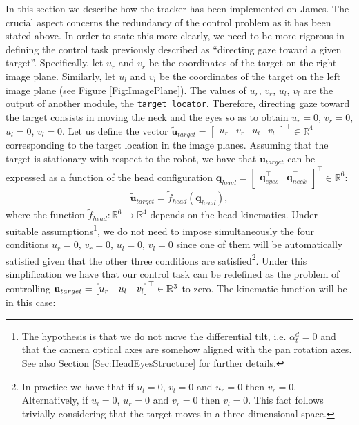 In this section we describe how the tracker has been implemented on James. The crucial aspect concerns the redundancy of the control problem as it has been stated above. In order to state this more clearly, we need to be more rigorous in defining the control task previously described as ``directing gaze toward a given target''. Specifically, let $u_r$ and $v_r$ be the coordinates of the target on the right image plane. Similarly, let $u_l$ and $v_l$ be the coordinates of the target on the left image plane (see Figure \ref{Fig:ImagePlane}). The values of $u_r$, $v_r$, $u_l$, $v_l$ are the output of another module, the {\tt target locator}. Therefore, directing gaze toward the target consists in moving the neck and the eyes so as to obtain $u_r=0$, $v_r=0$, $u_l=0$, $v_l=0$. Let us define the vector $\tilde {\mathbf u}_{target}= \begin{bmatrix} u_r & v_r & u_l & v_l \end{bmatrix}^\top \in \mathbb R^4$ corresponding to the target location in the image planes. Assuming that the target is stationary with respect to the robot, we have that $\tilde {\mathbf u}_{target}$ can be expressed as a function of the head configuration $\mathbf q_{head} = \begin{bmatrix} \mathbf q_{eyes}^\top & \mathbf q_{neck}^\top \end{bmatrix}^\top \in \mathbb R^6$:
\begin{eqnarray*}
\tilde {\mathbf u}_{target} = \tilde f_{head} (\mathbf q_{head}),
\end{eqnarray*}
where the function $\tilde f_{head} : \mathbb R^6 \longrightarrow \mathbb R^4$ depends on the head kinematics. Under suitable assumptions\footnote{The hypothesis is that we do not move the differential tilt, i.e. $\alpha_t^d = 0$ and that the camera optical axes are somehow aligned with the pan rotation axes. See also Section \ref{Sec:HeadEyesStructure} for further details.}, we do not need to impose simultaneously the four conditions $u_r=0$, $v_r=0$, $u_l=0$, $v_l=0$ since one of them will be automatically satisfied given that the other three conditions are satisfied\footnote{In practice we have that if $u_l=0$, $v_l=0$ and $u_r=0$ then $v_r=0$. Alternatively, if $u_l=0$, $u_r=0$ and $v_r=0$ then $v_l=0$. This fact follows trivially considering that the target moves in a three dimensional space.}. Under this simplification we have that our control task can be redefined as the problem of controlling $\mathbf{u}_{target} = \begin{bmatrix} u_r & u_l & v_l \end{bmatrix}^\top \in \mathbb R^3$ to zero. The kinematic function will be in this case:
